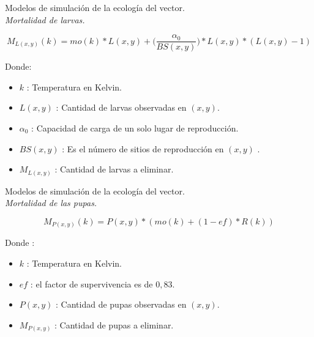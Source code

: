 \begin{frame}[c]{Modelos de simulación de la ecología del vector.\\\textit{Mortalidad de larvas.}}
  \begin{center}
      \begin{equation}
      M_{L(x,y)}(k) = mo(k) * L(x,y) + \bigg(\frac{\alpha _{0}}{BS(x,y)}\bigg) * L(x,y) *(L(x,y) - 1)
    \end{equation}
  \end{center}
  Donde:
 \begin{itemize}
      \item $k$ : Temperatura en Kelvin.
      \item $L(x, y)$ : Cantidad de larvas observadas en $(x,y)$.
      \item $\alpha _{0}$ : Capacidad de carga de un solo lugar de reproducción.
      \item $BS(x,y)$ : Es el número de sitios de reproducción en $(x,y)$ .
      \item $M_{L(x,y)}$ : Cantidad de larvas a eliminar.
    \end{itemize}
\end{frame}

\begin{frame}[c]{Modelos de simulación de la ecología del vector.\\\textit{Mortalidad de las pupas.}}
  \begin{center}
    \begin{equation}
        M_{P(x,y)}(k) = P(x,y) * (mo(k) + (1 - ef) * R(k))
    \end{equation}
  \end{center}
  Donde :
    \begin{itemize}
      \item $k$ : Temperatura en Kelvin.
      \item $ef$ : el factor de supervivencia es de $0,83$.
      \item $P(x, y)$ : Cantidad de pupas observadas en $(x,y)$.
      \item $M_{P(x,y)}$ : Cantidad de pupas a eliminar.
    \end{itemize}
\end{frame}

